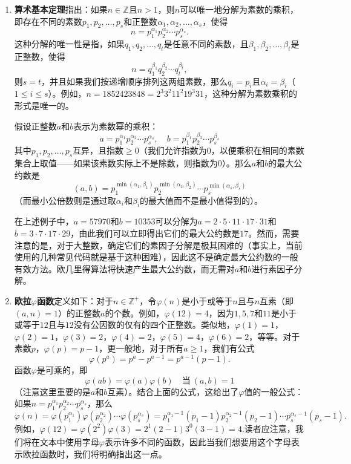 \begin{enumerate}[label=(\arabic*)]
\item \textbf{算术基本定理}指出：如果$n \in \mathbb{Z}$且$n > 1$，则$n$可以唯一地分解为素数的乘积，即存在不同的素数$p_1, p_2, \ldots, p_s$和正整数$\alpha_1, \alpha_2, \ldots, \alpha_s$，使得
\[
n = p_1^{\alpha_1} p_2^{\alpha_2} \cdots p_s^{\alpha_s}.
\]
这种分解的唯一性是指，如果$q_1, q_2, \ldots, q_t$是任意不同的素数，且$\beta_1, \beta_2, \ldots, \beta_t$是正整数，使得
\[
n = q_1^{\beta_1} q_2^{\beta_2} \cdots q_t^{\beta_t},
\]
则$s = t$，并且如果我们按递增顺序排列这两组素数，那么$q_i = p_i$且$\alpha_i = \beta_i$（$1 \leq i \leq s$）。例如，$n = 1852423848 = 2^3 3^2 11^2 19^3 31$，这种分解为素数乘积的形式是唯一的。

假设正整数$a$和$b$表示为素数幂的乘积：
\[
a = p_1^{\alpha_1} p_2^{\alpha_2} \cdots p_s^{\alpha_s}, \quad b = p_1^{\beta_1} p_2^{\beta_2} \cdots p_s^{\beta_s}
\]
其中$p_1, p_2, \ldots, p_s$互异，且指数$\geq 0$（我们允许指数为$0$，以便乘积在相同的素数集合上取值——如果该素数实际上不是除数，则指数为$0$）。那么$a$和$b$的最大公约数是
\[
(a, b) = p_1^{\min(\alpha_1, \beta_1)} p_2^{\min(\alpha_2, \beta_2)} \cdots p_s^{\min(\alpha_s, \beta_s)}
\]
（而最小公倍数则是通过取$\alpha_i$和$\beta_i$的最大值而不是最小值得到的）。

\begin{example}
在上述例子中，$a = 57970$和$b = 10353$可以分解为$a = 2 \cdot 5 \cdot 11 \cdot 17 \cdot 31$和$b = 3 \cdot 7 \cdot 17 \cdot 29$，由此我们可以立即得出它们的最大公约数是$17$。然而，需要注意的是，对于大整数，确定它们的素因子分解是极其困难的（事实上，当前使用的几种常见代码就是基于这种困难），因此这不是确定最大公约数的一般有效方法。欧几里得算法将快速产生最大公约数，而无需对$a$和$b$进行素因子分解。
\end{example}

\item \textbf{欧拉$\varphi$函数}定义如下：对于$n \in \mathbb{Z}^+$，令$\varphi(n)$是小于或等于$n$且与$n$互素（即$(a, n) = 1$）的正整数$a$的个数。例如，$\varphi(12) = 4$，因为$1, 5, 7$和$11$是小于或等于$12$且与$12$没有公因数的仅有的四个正整数。类似地，$\varphi(1) = 1$，$\varphi(2) = 1$，$\varphi(3) = 2$，$\varphi(4) = 2$，$\varphi(5) = 4$，$\varphi(6) = 2$，等等。对于素数$p$，$\varphi(p) = p - 1$，更一般地，对于所有$a \geq 1$，我们有公式
\[
\varphi(p^a) = p^a - p^{a-1} = p^{a-1}(p - 1).
\]
函数$\varphi$是可乘的，即
\[
\varphi(ab) = \varphi(a)\varphi(b) \quad \text{当} \ (a, b) = 1
\]
（注意这里重要的是$a$和$b$互素）。结合上面的公式，这给出了$\varphi$值的一般公式：如果$n = p_1^{\alpha_1} p_2^{\alpha_2} \cdots p_s^{\alpha_s}$，那么
\[
\varphi(n) = \varphi(p_1^{\alpha_1})\varphi(p_2^{\alpha_2}) \cdots \varphi(p_s^{\alpha_s}) = p_1^{\alpha_1 - 1}(p_1 - 1)p_2^{\alpha_2 - 1}(p_2 - 1) \cdots p_s^{\alpha_s - 1}(p_s - 1).
\]
例如，$\varphi(12) = \varphi(2^2)\varphi(3) = 2^1(2 - 1)3^0(3 - 1) = 4$.读者应注意，我们将在文本中使用字母$\varphi$表示许多不同的函数，因此当我们想要用这个字母表示欧拉函数时，我们将明确指出这一点。
\end{enumerate}

